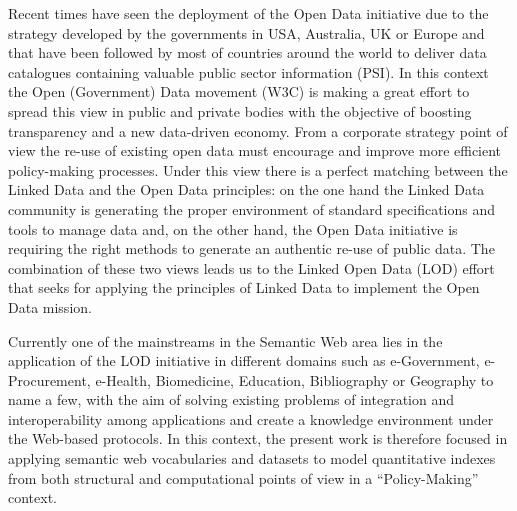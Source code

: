 Recent times have seen the deployment of the Open Data initiative due to the strategy 
developed by the governments in USA, Australia, UK or Europe and that have been followed by most of countries around the world to deliver data 
catalogues containing valuable public sector information (PSI). In this context the Open (Government) Data movement (W3C) is making a great effort 
to spread this view in public and private bodies with the objective of boosting transparency and a new data-driven economy. 
From a corporate strategy point of view the re-use of existing open data must encourage and improve 
more efficient policy-making processes. Under this view there is a perfect matching between the Linked Data and the Open Data 
principles: on the one hand the Linked Data community is generating the proper environment of standard 
specifications and tools to manage data and, on the other hand, the Open Data initiative is requiring 
the right methods to generate an authentic re-use of public data. The combination of these 
two views leads us to the Linked Open Data (LOD) effort that seeks for applying the principles of Linked Data to implement the Open Data mission.

Currently one of the mainstreams in the Semantic Web area lies in the application of the LOD initiative in 
different domains such as  e-Government, e-Procurement, e-Health, Biomedicine, Education, Bibliography or Geography to name a few,  
with the aim of solving existing problems of integration and interoperability among applications and create a 
knowledge environment under the Web-based protocols. In this context, the present work is therefore focused 
in applying semantic web vocabularies and datasets to model quantitative indexes from both structural 
and computational points of view in a ``Policy-Making'' context. 

